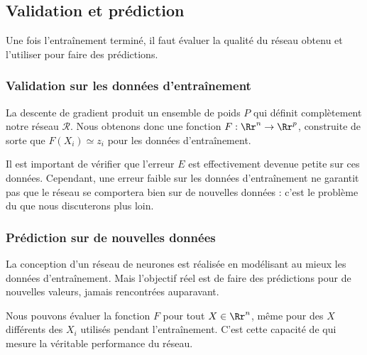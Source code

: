 \subsection{Validation et prédiction}

Une fois l'entraînement terminé, il faut évaluer la qualité du réseau obtenu et l'utiliser pour faire des prédictions.

\subsubsection*{Validation sur les données d'entraînement}

La descente de gradient produit un ensemble de poids $P$ qui définit complètement notre réseau $\mathcal{R}$.
Nous obtenons donc une fonction $F : \Rr^n \to \Rr^p$, construite de sorte que $F(X_i) \simeq z_i$ pour les données d'entraînement.

Il est important de vérifier que l'erreur $E$ est effectivement devenue petite sur ces données. Cependant, une erreur faible sur les données d'entraînement ne garantit pas que le réseau se comportera bien sur de nouvelles données : c'est le problème du  que nous discuterons plus loin.


\subsubsection*{Prédiction sur de nouvelles données}

La conception d'un réseau de neurones est réalisée en modélisant au mieux les données d'entraînement. Mais l'objectif réel est de faire des prédictions pour de nouvelles valeurs, jamais rencontrées auparavant.

Nous pouvons évaluer la fonction $F$ pour tout $X \in \Rr^n$, même pour des $X$ différents des $X_i$ utilisés pendant l'entraînement. C'est cette capacité de  qui mesure la véritable performance du réseau.


